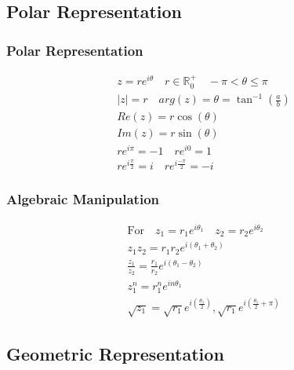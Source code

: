 \documentclass[../main]{subfiles}
\begin{document}
\subsection{Polar Representation}
	
	\subsubsection{Polar Representation}
	\begin{equation*} \begin{gathered}
		z = re^{i\theta} \quad r \in \mathbb{R}^{+}_0 \quad -\pi < \theta \leq \pi \\
		|z| = r \quad arg(z) = \theta = \tan^{-1}(\frac{a}{b}) \\
		Re(z) = r\cos(\theta) \\ Im(z) = r\sin(\theta) \\
		re^{i\pi} = -1 \quad re^{i0} = 1 \\
		re^{i\frac{\pi}{2}} = i \quad re^{i\frac{-\pi}{2}} = -i
	\end{gathered} \end{equation*}
	\subsubsection{Algebraic Manipulation}
	\begin{equation*} \begin{gathered}
		\text{For} \quad z_1 = r_1e^{i\theta_1} \quad z_2 = r_2e^{i\theta_2} \\
		z_1z_2 = r_1r_2 e^{i(\theta_1+\theta_2)} \\
		\frac{z_1}{z_2} = \frac{r_1}{r_2} e^{i(\theta_1-\theta_2)} \\
		z_1^n = r_1^n e^{in\theta_1} \\
		\sqrt{z_1} = \sqrt{r_1} e^{i(\frac{\theta_1}{2})}, \sqrt{r_1} e^{i(\frac{\theta_1}{2}+\pi)}
	\end{gathered} \end{equation*}

\subsection{Geometric Representation}
	
\end{document}
